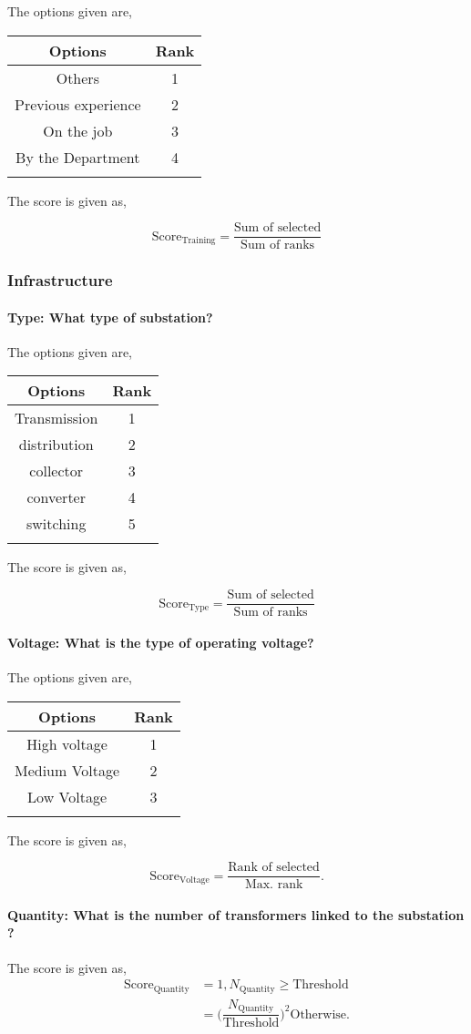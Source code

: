 \documentclass[oneside,twocolumn]{article}
\newcommand{\tsub}[2]{\text{#1}_{\text{#2}}}
\newcommand{\tsubb}[2]{#1_{\text{#2}}}
\newcommand{\dsub}[2]{\dfrac{\text{#1}}{\text{#2}}}
\newcommand{\multsel}[1]
{
	\[
		\tsub{Score}{#1} = \dsub{Sum of selected}{Sum of ranks}
	\]
}
\newcommand{\singsel}[1]
{
	\[
		\tsub{Score}{#1} = \dsub{Rank of selected}{Max. rank}.
	\]
}
\newenvironment{ttable}
{
\begin{center}
\begin{tabular}{c|c}
\hline
}
{
\\ \hline
\end{tabular}
\end{center}
}
\begin{document}
The options given are,
\begin{ttable}
Options & Rank \\ \hline
Others  & 1 \\
Previous experience & 2 \\
On the job & 3 \\
By the Department & 4 \\
\hline
\end{ttable}
The score is given as,
\multsel{Training}
\subsubsection{Infrastructure}

\paragraph{Type: What type of substation?}

The options given are,
\begin{ttable}
Options & Rank \\ \hline
Transmission & 1 \\
distribution & 2 \\
collector & 3 \\
converter & 4 \\
switching & 5 \\
\hline
\end{ttable}
The score is given as,
\multsel{Type}
\paragraph{Voltage: What is the type of operating voltage? }

The options given are,
\begin{ttable}
Options & Rank \\ \hline
High voltage & 1 \\
Medium Voltage & 2 \\
Low Voltage & 3 \\
\hline
\end{ttable}
The score is given as,
\singsel{Voltage}
\paragraph{Quantity: What is the number of transformers linked to the substation ?}

The score is given as,
\begin{align*}
\tsub{Score}{Quantity} &= 1, \tsubb{N}{Quantity} \ge \text{Threshold} \\
        &=
\Big(\dfrac{\tsubb{N}{Quantity}}{\text{Threshold}}\Big)^{2}
\text{Otherwise}.
\end{align*}
\end{document}

